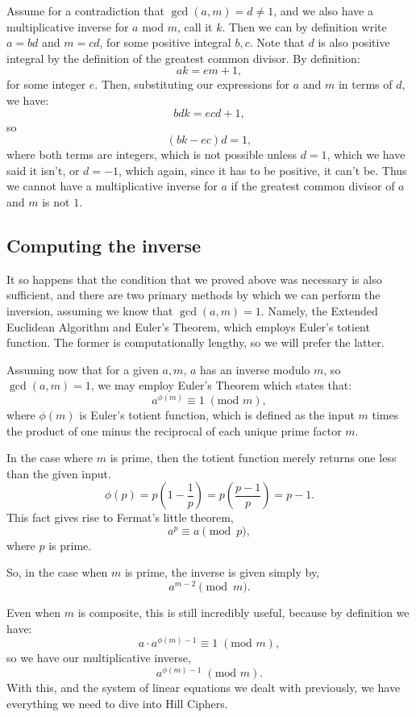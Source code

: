 \documentclass{article}
\begin{document}
\noindent Assume for a contradiction that $\gcd(a, m) = d \neq 1$, and we also have a multiplicative inverse for $a$ mod $m$, call it $k$. Then we can by definition write $a = bd$ and $m = cd$, for some positive integral $b, c$. Note that $d$ is also positive integral by the definition of the greatest common divisor. By definition:
\[
    ak = em + 1,
\]
for some integer $e$. Then, substituting our expressions for $a$ and $m$ in terms of $d$, we have:
\[
    bdk = ecd + 1,
\]
so
\[
    (bk - ec)d = 1,
\]
where both terms are integers, which is not possible unless $d = 1$, which we have said it isn't, or $d = -1$, which again, since it has to be positive, it can't be. Thus we cannot have a multiplicative inverse for $a$ if the greatest common divisor of $a$ and $m$ is not $1$. \medskip

\subsection{Computing the inverse}
It so happens that the condition that we proved above was necessary is also sufficient, and there are two primary methods by which we can perform the inversion, assuming we know that $\gcd(a, m) = 1$. Namely, the Extended Euclidean Algorithm and Euler's Theorem, which employs Euler's totient function. The former is computationally lengthy, so we will prefer the latter. \medskip

\noindent Assuming now that for a given $a, m$, $a$ has an inverse modulo $m$, so $\gcd(a, m) = 1$, we may employ Euler's Theorem which states that:
\[
    a^{\phi(m)} \equiv 1 \; (\text{mod } m),
\]
where $\phi(m)$ is Euler's totient function, which is defined as the input $m $ times the product of one minus the reciprocal of each unique prime factor $m$. \medskip

\noindent In the case where $m$ is prime, then the totient function merely returns one less than the given input. 
\[
\phi(p)=p\left( 1-\frac{1}{p} \right)=p\left( \frac{p-1}{p} \right)=p-1 
.\] 
This fact gives rise to Fermat's little theorem, 
\[
    a^p \equiv a \pmod{p}
,\] 
where $p$ is prime. \medskip

\noindent So, in the case when $m$ is prime, the inverse is given simply by,
 \[
   a^{m-2} \pmod{m}
.\] 

\noindent Even when $m$ is composite, this is still incredibly useful, because by definition we have:
\[
    a \cdot a^{\phi(m) - 1} \equiv 1 \; (\text{mod } m),
\]
so we have our multiplicative inverse,
\[
    a^{\phi(m) - 1} \; (\text{mod } m).
\]
With this, and the system of linear equations we dealt with previously, we have everything we need to dive into Hill Ciphers.
\end{document}
